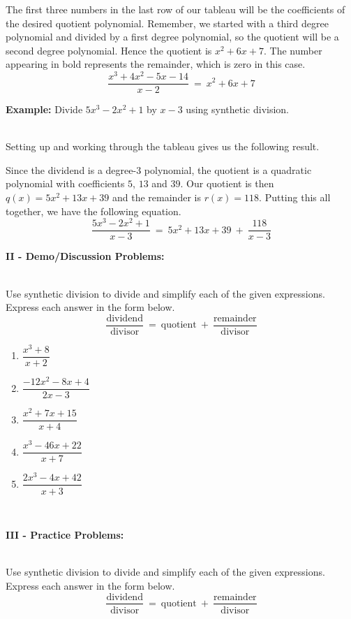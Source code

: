 \documentclass[12pt]{article}
\theoremstyle{definition}
\begin{document}
The first three numbers in the last row of our tableau will be the coefficients of the desired quotient polynomial.  Remember, we started with a third degree polynomial and divided by a first degree polynomial, so the quotient will be a second degree polynomial.  Hence the quotient is $x^2+6x+7$.  The number appearing in bold represents the remainder, which is zero in this case.
$$\frac{x^3+4x^2-5x-14}{x-2}~=~x^2+6x+7$$

{\bf Example:} Divide $5x^3-2x^2+1$ by $x-3$ using synthetic division.\\
\ \par
\begin{multicols}{2}
Setting up and working through the tableau gives us the following result.

\columnbreak

\begin{center}
\end{center}
\end{multicols}

Since the dividend is a degree-3 polynomial, the quotient is a quadratic polynomial with coefficients $5$, $13$ and $39$.  Our quotient is then
$q(x) = 5x^2+13x+39$ and the remainder is $r(x) = 118$.  Putting this all together, we have the following equation.
$$\frac{5x^3 - 2x^2 + 1}{x-3}~=~5x^2+13x+39~+~\frac{118}{x-3}$$

{\bf II - Demo/Discussion Problems:}\\
\ \par
Use synthetic division to divide and simplify each of the given expressions.  Express each answer in the form below.
$$\frac{\text{dividend}}{\text{divisor}} \ = \ \text{quotient} \ + \ \frac{\text{remainder}}{\text{divisor}}$$
\begin{enumerate}
	\item $\dfrac{x^3+8}{x+2}$
	\item $\dfrac{-12x^2-8x+4}{2x-3}$
	\item $\dfrac{x^2 + 7 x + 15}{x + 4}$
	\item $\dfrac{x^3 - 46 x + 22}{x + 7}$
	\item $\dfrac{2x^3-4x+42}{x+3}$
\end{enumerate}
\ \par
{\bf III - Practice Problems:}\\
\ \par
Use synthetic division to divide and simplify each of the given expressions.  Express each answer in the form below.
$$\frac{\text{dividend}}{\text{divisor}} \ = \ \text{quotient} \ + \ \frac{\text{remainder}}{\text{divisor}}$$
\end{document}
